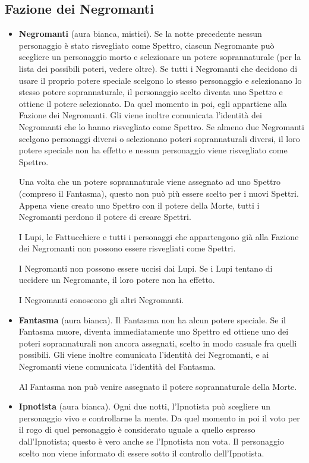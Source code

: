 \documentclass[a4paper,10pt]{article}
\begin{document}
\subsection*{Fazione dei Negromanti}
\label{negromanti}
\begin{itemize}

 \item {\bf Negromanti} (aura bianca, mistici).
 Se la notte precedente nessun personaggio è stato risvegliato come Spettro,
ciascun Negromante può scegliere un personaggio morto e selezionare un potere
soprannaturale (per la lista dei possibili poteri, vedere oltre).
 Se tutti i Negromanti che decidono di usare il proprio potere speciale scelgono
lo stesso personaggio e selezionano lo stesso potere soprannaturale, il
personaggio scelto diventa uno Spettro e ottiene il potere selezionato.
 Da quel momento in poi, egli appartiene alla Fazione dei Negromanti. Gli viene
inoltre comunicata l'identità dei Negromanti che lo hanno risvegliato come
Spettro.
 Se almeno due Negromanti scelgono personaggi diversi o selezionano poteri
soprannaturali diversi, il loro potere speciale non ha effetto e nessun
personaggio viene risvegliato come Spettro.
 
 Una volta che un potere soprannaturale viene assegnato ad uno Spettro (compreso
il Fantasma), questo non può più essere scelto per i nuovi Spettri. Appena viene
creato uno Spettro con il potere della Morte, tutti i Negromanti perdono il
potere di creare Spettri.
 
 I Lupi, le Fattucchiere e tutti i personaggi che appartengono già alla Fazione
dei Negromanti non possono essere risvegliati come Spettri.

 I Negromanti non possono essere uccisi dai Lupi. Se i Lupi tentano di uccidere
un Negromante, il loro potere non ha effetto.

 I Negromanti conoscono gli altri Negromanti.
 
 \item {\bf Fantasma} (aura bianca). Il Fantasma non ha alcun potere speciale.
Se il Fantasma muore, diventa immediatamente uno Spettro ed ottiene uno dei
poteri soprannaturali non ancora assegnati, scelto in modo casuale fra quelli
possibili. Gli viene inoltre comunicata l'identità dei Negromanti, e ai
Negromanti viene comunicata l'identità del Fantasma.
 
 Al Fantasma non può venire assegnato il potere soprannaturale della Morte.
 
 \item {\bf Ipnotista} (aura bianca). Ogni due notti, l'Ipnotista può scegliere
un personaggio vivo e controllarne la mente.
 Da quel momento in poi il voto per il rogo di quel personaggio è considerato
uguale a quello espresso dall'Ipnotista; questo è vero anche se l'Ipnotista non
vota.
 Il personaggio scelto non viene informato di essere sotto il controllo
dell'Ipnotista.
 

\end{itemize}
\end{document}
